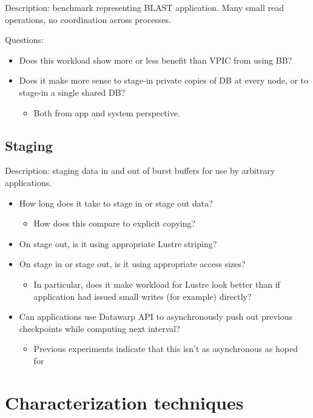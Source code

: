\documentclass[conference,10pt,compsocconf]{IEEEtran}
\begin{document}
Description: benchmark representing BLAST application.  Many small read
operations, no coordination across processes.

Questions:
\begin{itemize}
\item Does this workload show more or less benefit than VPIC from using BB?
\item Does it make more sense to stage-in private copies of DB at every
node, or to stage-in a single shared DB?
    \begin{itemize}
    \item Both from app and system perspective.
    \end{itemize}
\end{itemize}

\subsection{Staging}

Description: staging data in and out of burst buffers for use by arbitrary
applications.

\begin{itemize}
\item How long does it take to stage in or stage out data?
    \begin{itemize}
    \item How does this compare to explicit copying?
    \end{itemize}
\item On stage out, is it using appropriate Lustre striping?
\item On stage in or stage out, is it using appropriate access sizes?
    \begin{itemize}
    \item In particular, does it make workload for Lustre look better than if
    application had issued small writes (for example) directly?
    \end{itemize}
\item Can applications use Datawarp API to asynchronously push out previous
checkpoints while computing next interval?
    \begin{itemize}
    \item Previous experiments indicate that this isn't as asynchronous as
    hoped for
    \end{itemize}
\end{itemize}

\section{Characterization techniques}
\end{document}

